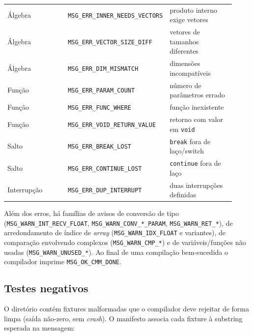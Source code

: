 \begin{longtable}{@{}p{0.30\linewidth}p{0.30\linewidth}p{0.32\linewidth}@{}}
Álgebra & \lstinline|MSG_ERR_INNER_NEEDS_VECTORS| & produto interno exige vetores \\
Álgebra & \lstinline|MSG_ERR_VECTOR_SIZE_DIFF| & vetores de tamanhos diferentes \\
Álgebra & \lstinline|MSG_ERR_DIM_MISMATCH| & dimensões incompatíveis \\
Função & \lstinline|MSG_ERR_PARAM_COUNT| & número de parâmetros errado \\
Função & \lstinline|MSG_ERR_FUNC_WHERE| & função inexistente \\
Função & \lstinline|MSG_ERR_VOID_RETURN_VALUE| & retorno com valor em \lstinline|void| \\
Salto & \lstinline|MSG_ERR_BREAK_LOST| & \lstinline|break| fora de laço/switch \\
Salto & \lstinline|MSG_ERR_CONTINUE_LOST| & \lstinline|continue| fora de laço \\
Interrupção & \lstinline|MSG_ERR_DUP_INTERRUPT| & duas interrupções definidas \\
\bottomrule
\end{longtable}

Além dos erros, há famílias de avisos de conversão de tipo
(\lstinline|MSG_WARN_INT_RECV_FLOAT|, \lstinline|MSG_WARN_CONV_*_PARAM|,
\lstinline|MSG_WARN_RET_*|), de arredondamento de índice de \emph{array}
(\lstinline|MSG_WARN_IDX_FLOAT| e variantes), de comparação envolvendo complexos
(\lstinline|MSG_WARN_CMP_*|) e de variáveis/funções não usadas
(\lstinline|MSG_WARN_UNUSED_*|). Ao final de uma compilação bem-sucedida o
compilador imprime \lstinline|MSG_OK_CMM_DONE|.

\subsection{Testes negativos}

O diretório  contém fixtures malformadas que o compilador deve
rejeitar de forma limpa (saída não-zero, sem \emph{crash}). O manifesto
 associa cada fixture à substring esperada na
mensagem:

